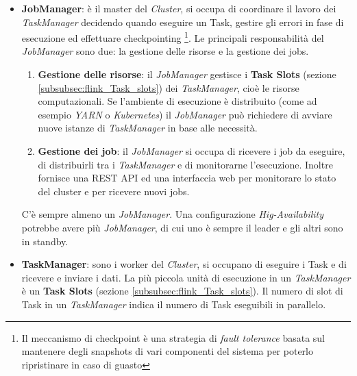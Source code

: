 \begin{itemize}
    \item \textbf{JobManager}: è il master del \textit{Cluster}, si occupa di coordinare il lavoro dei \textit{TaskManager} decidendo quando eseguire un Task,
    gestire gli errori in fase di esecuzione ed effettuare checkpointing 
    \footnote{Il meccanismo di checkpoint è una strategia di \textit{fault tolerance} basata sul mantenere degli snapshots di vari componenti del sistema
    per poterlo ripristinare in caso di guasto}.
    Le principali responsabilità del \textit{JobManager} sono due: la gestione delle risorse e la gestione dei jobs.
    \begin{enumerate}
        \item \textbf{Gestione delle risorse}: il \textit{JobManager} gestisce i \textbf{Task Slots} (sezione \ref{subsubsec:flink_Task_slots}) dei \textit{TaskManager}, cioè le risorse computazionali.
        Se l'ambiente di esecuzione è distribuito (come ad esempio \textit{YARN} o \textit{Kubernetes}) il \textit{JobManager} può richiedere di avviare nuove istanze di \textit{TaskManager} in base alle necessità.
        \item \textbf{Gestione dei job}: il \textit{JobManager} si occupa di ricevere i job da eseguire, di distribuirli tra i \textit{TaskManager} e di monitorarne l'esecuzione.
        Inoltre fornisce una REST API ed una interfaccia web per monitorare lo stato del cluster e per ricevere nuovi jobs.
    \end{enumerate}
    C'è sempre almeno un \textit{JobManager}. Una configurazione \textit{Hig-Availability} potrebbe avere più \textit{JobManager}, di cui uno è sempre il leader e gli altri sono in standby.
    \item \textbf{TaskManager}: sono i worker del \textit{Cluster}, si occupano di eseguire i Task e di ricevere e inviare i dati.
    La più piccola unità di esecuzione in un \textit{TaskManager} è un \textbf{Task Slots} (sezione \ref{subsubsec:flink_Task_slots}).
    Il numero di slot di Task in un \textit{TaskManager} indica il numero di Task eseguibili in parallelo.
\end{itemize}

